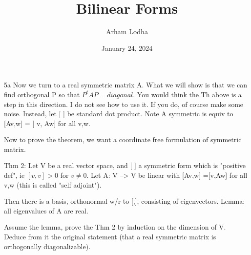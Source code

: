\documentclass{article}
\begin{document}
\title{Bilinear Forms}
\author{Arham Lodha}%
\date{January 24, 2024}%
\maketitle

\begin{PROB}{5a}\label{Problem 5a.}
    Now we turn to a real symmetric matrix A. What we will show is that we can find orthogonal P so that $P^tAP = diagonal$.  You would think the Th above is a step in this direction. I do not see how to use it. If you do, of course make some noise. Instead, let [ ] be standard dot product. Note A symmetric is equiv to [Av,w] = [ v, Aw] for all v,w. 
    
    Now to prove the theorem, we want a coordinate free formulation of symmetric matrix. 
    
    Thm 2: Let V be a real vector space, and [ ] a symmetric form which is "positive def", ie $[v,v] >0$ for $v \neq 0$. Let A: V --> V be linear with [Av,w] =[v,Aw] for all v,w (this is called "self adjoint").  
    
    Then there is a basis, orthonormal w/r to [,], consisting of eigenvectors. 
    Lemma: all eigenvalues of A are real. 
    
    Assume the lemma,  prove the Thm 2  by induction on the dimension of V. Deduce from it the original statement (that a real symmetric matrix is orthogonally diagonalizable). 
\end{PROB}
\end{document}

